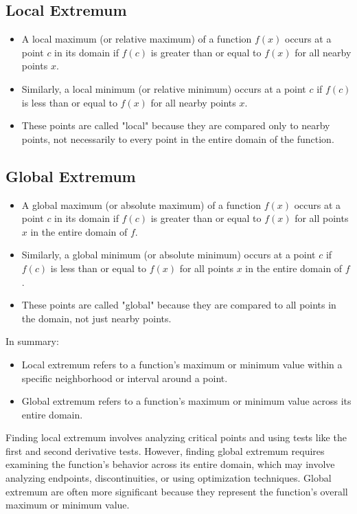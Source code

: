 \subsection{Local Extremum}
\begin{itemize}
    \item A local maximum (or relative maximum) of a function $f(x)$ occurs at a point $c$ in its domain if $f(c)$ is greater than or equal to $f(x)$ for all nearby points $x$.
    \item Similarly, a local minimum (or relative minimum) occurs at a point $c$ if $f(c)$ is less than or equal to $f(x)$ for all nearby points $x$.
    \item These points are called "local" because they are compared only to nearby points, not necessarily to every point in the entire domain of the function.
\end{itemize}

\subsection*{Global Extremum}
\begin{itemize}
    \item A global maximum (or absolute maximum) of a function $f(x)$ occurs at a point $c$ in its domain if $f(c)$ is greater than or equal to $f(x)$ for all points $x$ in the entire domain of $f$.
    \item Similarly, a global minimum (or absolute minimum) occurs at a point $c$ if $f(c)$ is less than or equal to $f(x)$ for all points $x$ in the entire domain of $f$.
    \item These points are called "global" because they are compared to all points in the domain, not just nearby points.
\end{itemize}

In summary:
\begin{itemize}
    \item Local extremum refers to a function's maximum or minimum value within a specific neighborhood or interval around a point.
    \item Global extremum refers to a function's maximum or minimum value across its entire domain.
\end{itemize}

Finding local extremum involves analyzing critical points and using tests like the first and second derivative tests. However, finding global extremum requires examining the function's behavior across its entire domain, which may involve analyzing endpoints, discontinuities, or using optimization techniques. Global extremum are often more significant because they represent the function's overall maximum or minimum value.


 



